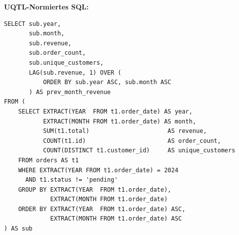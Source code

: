 \begin{successbox}
\textbf{UQTL-Normiertes SQL:}
\begin{lstlisting}[style=sqlstyle, numbers=none]
SELECT sub.year,
       sub.month,
       sub.revenue,
       sub.order_count,
       sub.unique_customers,
       LAG(sub.revenue, 1) OVER (
           ORDER BY sub.year ASC, sub.month ASC
       ) AS prev_month_revenue
FROM (
    SELECT EXTRACT(YEAR  FROM t1.order_date) AS year,
           EXTRACT(MONTH FROM t1.order_date) AS month,
           SUM(t1.total)                      AS revenue,
           COUNT(t1.id)                       AS order_count,
           COUNT(DISTINCT t1.customer_id)     AS unique_customers
    FROM orders AS t1
    WHERE EXTRACT(YEAR FROM t1.order_date) = 2024
      AND t1.status != 'pending'
    GROUP BY EXTRACT(YEAR  FROM t1.order_date),
             EXTRACT(MONTH FROM t1.order_date)
    ORDER BY EXTRACT(YEAR  FROM t1.order_date) ASC,
             EXTRACT(MONTH FROM t1.order_date) ASC
) AS sub
\end{lstlisting}
\end{successbox}

